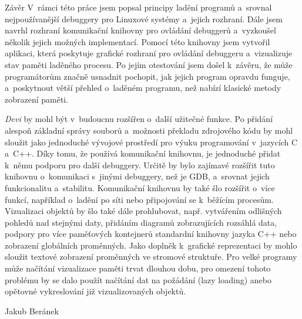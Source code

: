 \documentclass[czech,bachelor,male,python,dept460,hidelinks]{diploma}						%
\newcommand{\parspace}[1][]{
	\ifthenelse{\isempty{#1}}{\vspace{0mm}}{\vspace{#1}}
	\par
}
\begin{document}
\begin{section}{Závěr}
\label{sec:Conclusion}
	V~rámci této práce jsem popsal principy ladění programů a~srovnal nejpoužívanější debuggery pro Linuxové systémy a~jejich rozhraní. Dále jsem
	navrhl rozhraní komunikační knihovny pro ovládání debuggerů a~vyzkoušel několik jejich možných implementací. Pomocí této knihovny jsem
	vytvořil aplikaci, která poskytuje grafické rozhraní pro ovládání debuggeru a~vizualizuje stav paměti laděného procesu. Po jejím otestování jsem
	došel k~závěru, že může programátorům značně usnadnit pochopit, jak jejich program opravdu funguje, a~poskytnout větší přehled o~laděném programu, než
	nabízí klasické metody zobrazení paměti.

	\parspace \textit{Devi} by mohl být v~budoucnu rozšířen o~další užitečné funkce. Po přidání alespoň základní správy souborů a~možnosti překladu
	zdrojového kódu by mohl sloužit jako jednoduché vývojové prostředí pro výuku programování v~jazycích C a~C++.
	Díky tomu, že používá komunikační knihovnu, je jednoduché přidat k~němu podporu pro další debuggery. Určitě by bylo
	zajímavé rozšířit tuto knihovnu o~komunikaci s~jinými debuggery, než je GDB, a~srovnat jejich funkcionalitu a~stabilitu.
	Komunikační knihovnu by také šlo rozšířit o~více funkcí, například o~ladění po síti nebo připojování se k~běžícím procesům.
	Vizualizaci objektů by šlo také dále prohlubovat, např. vytvářením odlišných pohledů nad stejnými daty, přidáním diagramů zobrazujících rozsáhlá data,
	podpory pro více paměťových kontejnerů standardní knihovny jazyka C++ nebo zobrazení globálních proměnných.
	Jako doplněk k~grafické reprezentaci by mohlo sloužit textové zobrazení proměnných ve stromové struktuře.
	Pro velké programy může načítání vizualizace paměti trvat dlouhou dobu, pro omezení tohoto problému by se dalo použít načítání dat na požádání
	(lazy loading) anebo opětovné vykreslování již vizualizovaných objektů.
\end{section}

\bigskip
\begin{flushright}
Jakub Beránek
\end{flushright}

\printbibheading[title=Literatura, heading=bibintoc]
\printbibliography[heading=none]
\end{document}
